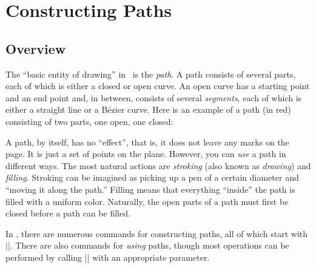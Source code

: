 %
%
%


\section{Constructing Paths}

\subsection{Overview}

The ``basic entity of drawing'' in \pgfname\ is the \emph{path}. A path
consists of several parts, each of which is either a closed or open curve. An
open curve has a starting point and an end point and, in between, consists of
several \emph{segments}, each of which is either a straight line or a Bézier
curve. Here is an example of a path (in red) consisting of two parts, one open,
one closed:
%
\begin{codeexample}[]
\end{codeexample}

A path, by itself, has no ``effect'', that is, it does not leave any marks on
the page. It is just a set of points on the plane. However, you can \emph{use}
a path in different ways. The most natural actions are \emph{stroking} (also
known as \emph{drawing}) and \emph{filling}. Stroking can be imagined as
picking up a pen of a certain diameter and ``moving it along the path.''
Filling means that everything ``inside'' the path is filled with a uniform
color. Naturally, the open parts of a path must first be closed before a path
can be filled.

In \pgfname, there are numerous commands for constructing paths, all of which
start with |\pgfpath|. There are also commands for \emph{using} paths, though
most operations can be performed by calling |\pgfusepath| with an appropriate
parameter.

